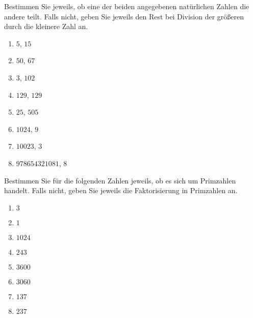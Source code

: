 
Bestimmen Sie jeweils, ob eine der beiden angegebenen natürlichen Zahlen die andere teilt. Falls nicht, geben Sie jeweils den Rest bei Division der größeren durch die kleinere Zahl an.\\
\parbox{0.5\textwidth}{\begin{enumerate}
\item $5$, $15$    %
\item $50$, $67$   %
\item $3$, $102$   %
\item $129$, $129$   %
\end{enumerate}}\parbox{0.5\textwidth}{\begin{enumerate}\setcounter{enumi}{4}
\item $25$, $505$  %
\item $1024$, $9$  %
\item $10023$, $3$ %
\item $978654321081$, $8$ %
\end{enumerate}}




Bestimmen Sie für die folgenden Zahlen jeweils, ob es sich um Primzahlen handelt. Falls nicht, geben Sie jeweils die Faktorisierung in Primzahlen an.\\
\parbox{0.5\textwidth}{\begin{enumerate}
\item $3$    %
\item $1$    %
\item $1024$ %
\item $243$  %
\end{enumerate}}\parbox{0.5\textwidth}{\begin{enumerate}\setcounter{enumi}{4}
\item $3600$ %
\item $3060$ %
\item $137$  %
\item $237$  %
\end{enumerate}}


\pagebreak




